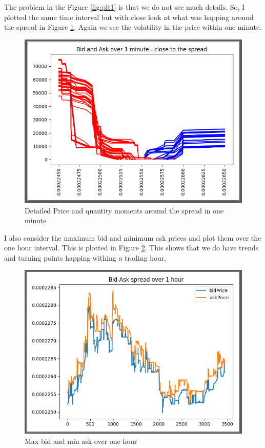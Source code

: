 \documentclass[12pt]{article}
\begin{document}
The problem in the Figure \ref{fig:plt1} is that we do not see much details. So, I plotted the same time interval but with close look at what was happing around the spread in Figure \ref{fig:plt2}. Again we see the volatility in the price within one minute.

\begin{figure}[h!]
	\centering
  \includegraphics[scale=0.5]{plot2.png}
  \caption{Detailed Price and quantity moments around the spread in one minute}
  \label{fig:plt2}
\end{figure}

I also consider the maximum bid and minimum ask prices and plot them over the one hour interval. This is plotted in Figure \ref{fig:plt3}. This shows that we do have trends and turning points happing withing a trading hour.

\begin{figure}[h!]
	\centering
  \includegraphics[scale=0.5]{plot3.png}
  \caption{Max bid and min ask over one hour}
  \label{fig:plt3}
\end{figure}
\end{document}
